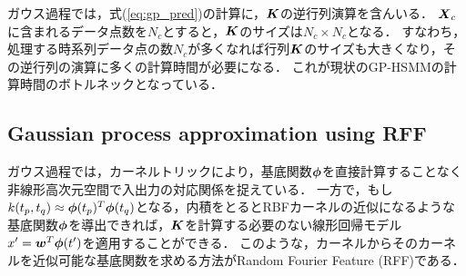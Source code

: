 \documentclass[conference]{IEEEtran}
\begin{document}
ガウス過程では，式(\ref{eq:gp_pred})の計算に，${ \boldsymbol K}$の逆行列演算を含んいる．
${ \boldsymbol X}_c$に含まれるデータ点数を$N_c$とすると，${ \boldsymbol K}$のサイズは$N_c \times N_c$となる．
すなわち，処理する時系列データ点の数$N_c$が多くなれば行列${ \boldsymbol K}$のサイズも大きくなり，その逆行列の演算に多くの計算時間が必要になる．
これが現状のGP-HSMMの計算時間のボトルネックとなっている．

\subsection{Gaussian process approximation using RFF}
ガウス過程では，カーネルトリックにより，基底関数${\boldsymbol\phi}$を直接計算することなく非線形高次元空間で入出力の対応関係を捉えている．
一方で，もし$k(t_p,t_q)\approx {\boldsymbol\phi}(t_p)^T {\boldsymbol\phi}(t_q)$となる，内積をとるとRBFカーネルの近似になるような基底関数${\boldsymbol\phi}$を導出できれば，${ \boldsymbol K}$を計算する必要のない線形回帰モデル$x'={ \boldsymbol w}^T {\boldsymbol\phi}(t')$を適用することができる．
このような，カーネルからそのカーネルを近似可能な基底関数を求める方法がRandom Fourier Feature (RFF)\cite{Rahimi2007}である．
\end{document}
